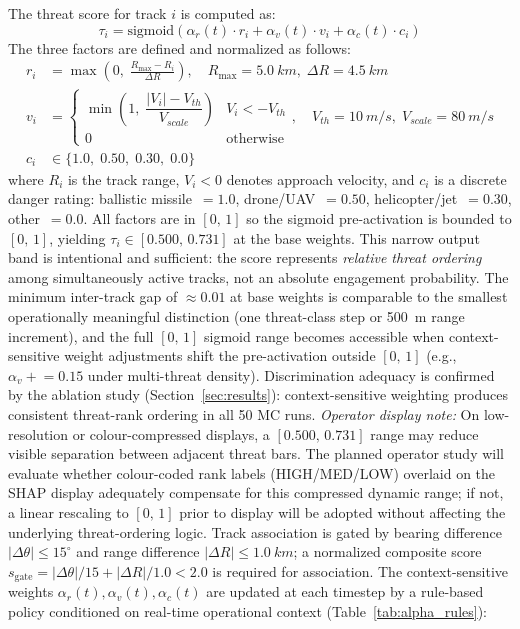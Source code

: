 \documentclass[drones,article,submit,pdftex]{Definitions/mdpi}
\begin{document}
The threat score for track $i$ is computed as:
\begin{equation}
  \tau_i = \text{sigmoid}\!\left(
    \alpha_r(t) \cdot r_i + \alpha_v(t) \cdot v_i + \alpha_c(t) \cdot c_i
  \right)
  \label{eq:threat_score}
\end{equation}
The three factors are defined and normalized as follows:
\begin{align}
  r_i &= \max\!\left(0,\;\frac{R_{\max} - R_i}{\Delta R}\right),
        \quad R_{\max} = \SI{5.0}{km},\; \Delta R = \SI{4.5}{km}
        \label{eq:r_norm} \\
  v_i &= \begin{cases}
            \min\!\left(1,\;\dfrac{|V_i| - V_{th}}{V_{scale}}\right) & V_i < -V_{th} \\[4pt]
            0 & \text{otherwise}
          \end{cases},
        \quad V_{th} = \SI{10}{m/s},\; V_{scale} = \SI{80}{m/s}
        \label{eq:v_norm} \\
  c_i &\in \{1.0,\; 0.50,\; 0.30,\; 0.0\}
        \label{eq:c_norm}
\end{align}
where $R_i$ is the track range, $V_i < 0$ denotes approach velocity,
and $c_i$ is a discrete danger rating: ballistic missile~$= 1.0$,
drone/UAV~$= 0.50$, helicopter/jet~$= 0.30$, other~$= 0.0$.
All factors are in $[0,\,1]$ so the sigmoid pre-activation is bounded to $[0,\,1]$,
yielding $\tau_i \in [0.500,\,0.731]$ at the base weights.
This narrow output band is intentional and sufficient: the score represents
\emph{relative threat ordering} among simultaneously active tracks, not an absolute
engagement probability.
The minimum inter-track gap of $\approx 0.01$ at base weights is comparable to the
smallest operationally meaningful distinction (one threat-class step or
\SI{500}{m} range increment), and the full $[0,\,1]$ sigmoid range becomes
accessible when context-sensitive weight adjustments shift the pre-activation outside
$[0,\,1]$ (e.g., $\alpha_v\!\mathrel{+}=\!0.15$ under multi-threat density).
Discrimination adequacy is confirmed by the ablation study (Section~\ref{sec:results}):
context-sensitive weighting produces consistent threat-rank ordering in all 50 MC runs.
\emph{Operator display note:} On low-resolution or colour-compressed displays,
a $[0.500,\,0.731]$ range may reduce visible separation between adjacent threat bars.
The planned operator study will evaluate whether colour-coded rank labels (HIGH/MED/LOW)
overlaid on the SHAP display adequately compensate for this compressed dynamic range;
if not, a linear rescaling to $[0,\,1]$ prior to display will be adopted without
affecting the underlying threat-ordering logic.
Track association is gated by bearing difference $|\Delta\theta| \leq 15^\circ$
and range difference $|\Delta R| \leq \SI{1.0}{km}$; a normalized composite
score $s_\text{gate} = |\Delta\theta|/15 + |\Delta R|/1.0 < 2.0$ is required
for association.
The context-sensitive weights $\alpha_r(t), \alpha_v(t), \alpha_c(t)$ are
updated at each timestep by a rule-based policy conditioned on real-time
operational context (Table~\ref{tab:alpha_rules}):
\end{document}
